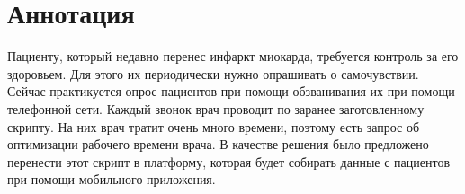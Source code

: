 \section*{Аннотация}

Пациенту, который недавно перенес инфаркт миокарда, требуется контроль за его здоровьем.
Для этого их периодически нужно опрашивать о самочувствии.
Сейчас практикуется опрос пациентов при помощи обзванивания их при помощи телефонной сети.
Каждый звонок врач проводит по заранее заготовленному скрипту.
На них врач тратит очень много времени, поэтому есть запрос об оптимизации рабочего времени врача.
В качестве решения было предложено перенести этот скрипт в платформу, которая будет собирать данные с пациентов при помощи мобильного приложения.

